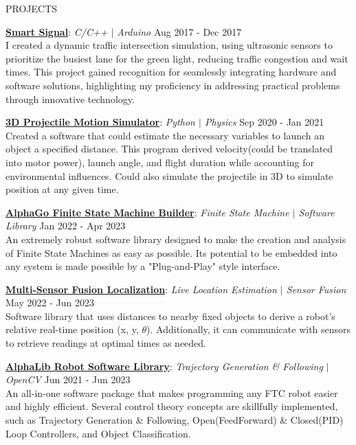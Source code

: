 \documentclass{resume} %
\begin{document}
\begin{rSection}{PROJECTS}
\vspace{-1.25em}
\item{\underline{\textbf{Smart Signal}}}: \textit{C/C++ $\vert$ Arduino} \hfill {Aug 2017 - Dec 2017}\vspace{0.25em} \\
{I created a dynamic traffic intersection simulation, using ultrasonic sensors to prioritize the busiest lane for the green light, reducing traffic congestion and wait times. This project gained recognition for seamlessly integrating hardware and software solutions, highlighting my proficiency in addressing practical problems through innovative technology.}

\item{\underline{\textbf{3D Projectile Motion Simulator}}}: \textit{Python $\vert$ Physics} \hfill {Sep 2020 - Jan 2021}\vspace{0.25em} \\
{Created a software that could estimate the necessary variables to launch an object a specified distance. This program derived velocity(could be translated into motor power), launch angle, and flight duration while accounting for environmental influences. Could also simulate the projectile in 3D to simulate position at any given time.}

\item{\underline{\textbf{AlphaGo Finite State Machine Builder}}}: \textit{Finite State Machine $\vert$ Software Library} \hfill {Jan 2022 - Apr 2023}\vspace{0.25em} \\
{An extremely robust software library designed to make the creation and analysis of Finite State Machines as easy as possible. Its potential to be embedded into any system is made possible by a "Plug-and-Play" style interface.}

\item{\underline{\textbf{Multi-Sensor Fusion Localization}}}: \textit{Live Location Estimation $\vert$ Sensor Fusion} \hfill {May 2022 - Jun 2023} \vspace{0.25em}\\
{Software library that uses distances to nearby fixed objects to derive a robot's relative real-time position (x, y, $\theta$). Additionally, it can communicate with sensors to retrieve readings at optimal times as needed.}

\item{\underline{\textbf{AlphaLib Robot Software Library}}}: \textit{Trajectory Generation \& Following $\vert$ OpenCV} \hfill {Jun 2021 - Jun 2023} \vspace{0.25em}\\
{An all-in-one software package that makes programming any FTC robot easier and highly efficient. Several control theory concepts are skillfully implemented, such as Trajectory Generation \& Following, Open(FeedForward) \& Closed(PID) Loop Controllers, and Object Classification.}
\end{rSection} 
\end{document}
